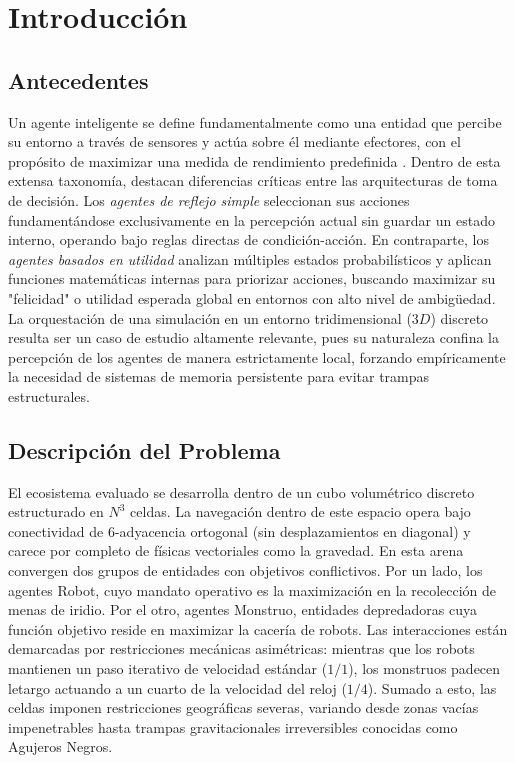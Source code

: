 \documentclass[conference]{IEEEtran}
\begin{document}
\section{Introducción}

\subsection{Antecedentes}
Un agente inteligente se define fundamentalmente como una entidad que percibe su entorno a través de sensores y actúa sobre él mediante efectores, con el propósito de maximizar una medida de rendimiento predefinida \cite{russell2010artificial}. Dentro de esta extensa taxonomía, destacan diferencias críticas entre las arquitecturas de toma de decisión. Los \textit{agentes de reflejo simple} seleccionan sus acciones fundamentándose exclusivamente en la percepción actual sin guardar un estado interno, operando bajo reglas directas de condición-acción. En contraparte, los \textit{agentes basados en utilidad} analizan múltiples estados probabilísticos y aplican funciones matemáticas internas para priorizar acciones, buscando maximizar su "felicidad" o utilidad esperada global en entornos con alto nivel de ambigüedad. La orquestación de una simulación en un entorno tridimensional ($3D$) discreto resulta ser un caso de estudio altamente relevante, pues su naturaleza confina la percepción de los agentes de manera estrictamente local, forzando empíricamente la necesidad de sistemas de memoria persistente para evitar trampas estructurales.

\subsection{Descripción del Problema}
El ecosistema evaluado se desarrolla dentro de un cubo volumétrico discreto estructurado en $N^3$ celdas. La navegación dentro de este espacio opera bajo conectividad de $6$-adyacencia ortogonal (sin desplazamientos en diagonal) y carece por completo de físicas vectoriales como la gravedad. En esta arena convergen dos grupos de entidades con objetivos conflictivos. Por un lado, los agentes Robot, cuyo mandato operativo es la maximización en la recolección de menas de iridio. Por el otro, agentes Monstruo, entidades depredadoras cuya función objetivo reside en maximizar la cacería de robots. Las interacciones están demarcadas por restricciones mecánicas asimétricas: mientras que los robots mantienen un paso iterativo de velocidad estándar ($1/1$), los monstruos padecen letargo actuando a un cuarto de la velocidad del reloj ($1/4$). Sumado a esto, las celdas imponen restricciones geográficas severas, variando desde zonas vacías impenetrables hasta trampas gravitacionales irreversibles conocidas como Agujeros Negros.
\end{document}
